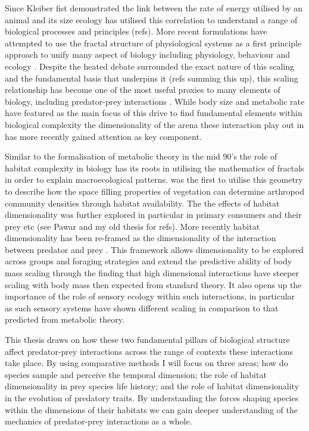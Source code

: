 Since Kleiber fist demonstrated the link between the rate of energy utilised by an animal and its size \citep{kleiber1947body} ecology has utilised this correlation to understand a range of biological processes and principles (refs). More recent formulations have attempted to use the fractal structure of physiological systems as a first principle approach to unify many aspect of biology including physiology, behaviour and ecology \citep{west1997general,brown2004}. Despite the heated debate surrounded the exact nature of this scaling and the fundamental basis that underpins it (refs summing this up), this scaling relationship has become one of the most useful proxies to many elements of biology, including predator-prey interactions \citep{brown2004}. While body size and metabolic rate have featured as the main focus of this drive to find fundamental elements within biological complexity the dimensionality of the arena these interaction play out in has more recently gained attention as key component.


Similar to the formalisation of metabolic theory in the mid 90's the role of habitat complexity in biology has its roots in utilising the mathematics of fractals in order to explain macroecological patterns. \cite{morse1985fractal} was the first to utilise this geometry to describe how the space filling properties of vegetation can determine arthropod community densities through habitat availability. The the effects of habitat dimensionality was further explored in particular in primary consumers and their prey etc (see Pawar and my old thesis for refs). More recently habitat dimensionality has been re-framed as the dimensionality of the interaction between predator and prey \citep{pawar2012dimensionality}. This framework allows dimensionality to be explored across groups and foraging strategies and extend the predictive ability of body mass scaling through the finding that high dimensional interactions have steeper scaling with body mass then expected from standard theory. It also opens up the importance of the role of sensory ecology within such interactions, in particular as such sensory systems have shown different scaling in comparison to that predicted from metabolic theory. %


This thesis draws on how these two fundamental pillars of biological structure affect predator-prey interactions across the range of contexts these interactions take place. By using comparative methods I will focus on three areas; how do species sample and perceive the temporal dimension; the role of habitat dimensionality in prey species life history; and the role of habitat dimensionality in the evolution of predatory traits. By understanding the forces shaping species within the dimensions of their habitats we can gain deeper understanding of the mechanics of predator-prey interactions as a whole.\\


